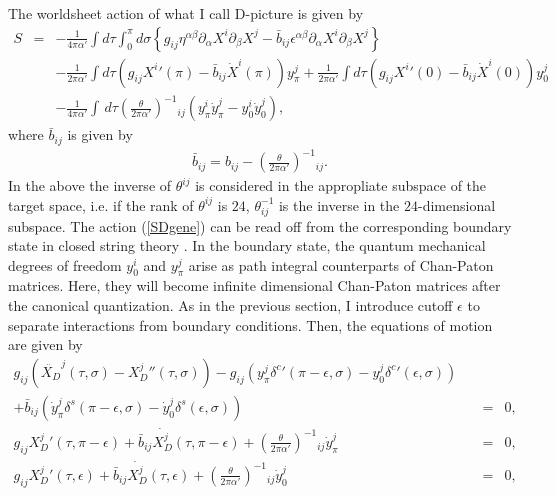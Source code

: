 \documentclass[a4paper,12pt]{article}
\newcommand{\nn}{\nonumber\\}
\newcommand{\pa}{\partial}
\newcommand{\e}{\epsilon}
\newcommand{\XD}{X_D}
\begin{document}
The worldsheet action of what I call
D-picture is given by 
\begin{eqnarray}
 \label{SDgene}
S &=&
-\frac{1}{4\pi\alpha'}
\int\!d\tau \int_0^{\pi}\!d\sigma
\left\{
g_{ij}\eta^{\alpha\beta}
\pa_\alpha X^i \pa_\beta X^j
-
\bar{b}_{ij} \epsilon^{\alpha\beta}
\pa_\alpha X^i \pa_\beta X^j
\right\} \nn
&&-
\frac{1}{2\pi\alpha'}\int\!d\tau
(g_{ij}{X^i}'(\pi)-\bar{b}_{ij}{\dot{X}^i(\pi)} )y^j_{\pi}
+
\frac{1}{2\pi\alpha'}\int\!d\tau
(g_{ij}{X^i}'(0)-\bar{b}_{ij}{\dot{X}^i(0)}) y^j_{0} \nn
&&
-\frac{1}{4\pi\alpha'}\int\,d\tau
\left(\frac{\theta}{2\pi\alpha'}
\right)^{-1}\!\!\!\!\!\! {}_{ij}
(
y_\pi^i \dot{y}_\pi^j
-
y_0^i \dot{y}_0^j),
\end{eqnarray}
where $\bar{b}_{ij}$ is given by
\begin{eqnarray}
 \label{bbar}
\bar{b}_{ij} = b_{ij} -  
\left(
\frac{\theta}{2\pi\alpha'}
\right)^{-1}
\!\!\!\!\!\!\!{}_{ij}.
\end{eqnarray}
In the above
the inverse of $\theta^{ij}$
is considered in the appropliate 
subspace of the target space,
i.e. if the rank of $\theta^{ij}$
is $24$, $\theta^{-1}_{ij}$ is the inverse
in the $24$-dimensional subspace. 
The action (\ref{SDgene}) can be read off
from 
the corresponding boundary state
in closed string theory 
\cite{Ish}\cite{Wilson,OkuB}.
In the boundary state, 
the quantum mechanical degrees of freedom
$y^i_0$ and $y^j_\pi$ arise as
path integral counterparts
of Chan-Paton matrices.
Here, they will become 
infinite dimensional Chan-Paton matrices
after the canonical quantization.
As in the previous section, I introduce
cutoff $\e$ to separate
interactions from
boundary conditions.
Then, the equations of motion are given by
\begin{eqnarray}
g_{ij} (\ddot{\XD}^j(\tau,\sigma)-{\XD^j}''(\tau,\sigma)  )
- g_{ij} (y_\pi^j
{\delta^c}'
(\pi-\epsilon,\sigma)-y_0^j{\delta^c}'(\epsilon,\sigma)  ) \quad &&\nn
+\bar{b}_{ij}
\left( 
\dot{y}_\pi^j 
      \delta^s(\pi-\epsilon,\sigma)
-\dot{y}_0^j 
      \delta^s(\epsilon,\sigma)  
\right)
&=& 0 ,  
\label{eqDxg}\\
g_{ij} {\XD^j}'(\tau,\pi-\epsilon) 
+\bar{b}_{ij}  \dot{\XD^j}(\tau,\pi-\epsilon)
+ \left(
\frac{\theta}{2\pi\alpha'}
\right)^{-1}\!\!\!\!\!\!\!{}_{ij} \dot{y}_\pi^j &=& 0, 
\label{eqDypig}\\
g_{ij} {\XD^j}'(\tau,\epsilon) 
+\bar{b}_{ij}  \dot{\XD^j}(\tau,\epsilon)
+\left(
\frac{\theta}{2\pi\alpha'}
\right)^{-1}\!\!\!\!\!\!\!{}_{ij}\dot{y}_0^j &=& 0,
\label{eqDy0g}
\end{eqnarray}
\end{document}

